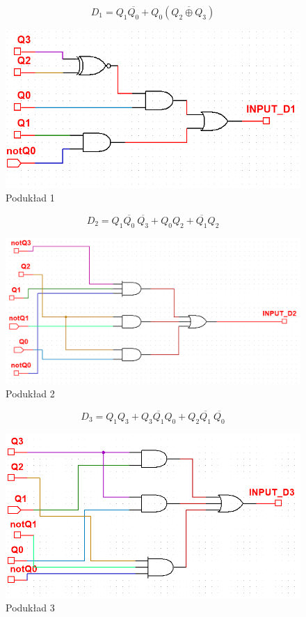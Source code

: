 \documentclass{article}
\begin{document}
\pagebreak
$$D_1 = Q_1\overline{Q_0} + Q_0(\overline{Q_2 \oplus Q_3})$$

\begin{figure}[H]
    \centering
    \includegraphics[width=\textwidth]{3b_impl_1.png}
    \caption{Podukład 1}
\end{figure}

$$D_2 = Q_1\overline{Q_0}\:\overline{Q_3} +
Q_0Q_2 + 
\overline{Q_1}Q_2$$

\begin{figure}[H]
    \centering
    \includegraphics[width=\textwidth]{3b_impl_2.png}
    \caption{Podukład 2}
\end{figure}

\pagebreak
$$D_3 = Q_1Q_3 +
Q_3\overline{Q_1}Q_0 + 
Q_2\overline{Q_1}\:\overline{Q_0}$$

\begin{figure}[H]
    \centering
    \includegraphics[width=\textwidth]{3b_impl_3.png}
    \caption{Podukład 3}
\end{figure}
\end{document}
